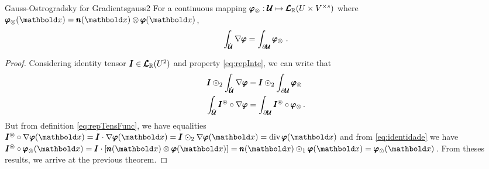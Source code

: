\begin{mcoro}{Gauss-Ostrogradsky for Gradients}{gauss2}
For a continuous mapping $\pmb{\varphi}_\otimes : \pmb{\mathcal{U}} \mapsto \pmb{\mathcal{L}}_{\mathbb{R}}(U\times V^{\times s})$ where $\fua{\vtf{\varphi}_\otimes}{\vto{x}}=\fua{\vtf{n}}{\vto{x}}\otimes\fua{\vtf{\varphi}}{\vto{x}}$,
\begin{equation*}
	\int_{\hat{\pmb{\mathcal{U}}}}\nabla{\pmb{\varphi}} = \int_{\partial{\pmb{\mathcal{U}}}}\pmb{\varphi}_\otimes\,\,.
\end{equation*}
\end{mcoro}
{\footnotesize
\begin{proof}
Considering identity tensor $\pmb{I}\in\pmb{\mathcal{L}}_{\mathbb{R}}(U^2)$ and property \eqref{eq:repInte}, we can write that
\begin{align*}
\pmb{I}\odot_2	\int_{\hat{\pmb{\mathcal{U}}}}\nabla{\pmb{\varphi}} & = \pmb{I}\odot_2 \int_{\partial{\pmb{\mathcal{U}}}}\pmb{\varphi}_\otimes\\
\int_{\hat{\pmb{\mathcal{U}}}} \pmb{{I}}^\circledast\circ\nabla{\pmb{\varphi}}& =\int_{\partial{\pmb{\mathcal{U}}}}\pmb{{I}}^\circledast\circ\pmb{\varphi}_\otimes\,.
\end{align*}
But from definition \eqref{eq:repTensFunc}, we have equalities $\fua{\frt{I}\circ\nabla{\vtf{\varphi}}}{\vto{x}}=\tnr{I}\cdot\fua{\nabla{\vtf{\varphi}}}{\vto{x}}=\tnr{I}\odot_2\fua{\nabla{\vtf{\varphi}}}{\vto{x}}=\fua{\dvt{\vtf{\varphi}}}{\vto{x}}$ and from \eqref{eq:identidade} we have $\fua{\frt{I}\circ\vtf{\varphi}_\otimes}{\vto{x}}=\tnr{I}\cdot[\fua{\vtf{n}}{\vto{x}}\otimes\fua{\vtf{\varphi}}{\vto{x}}]=\fua{\vtf{n}}{\vto{x}}\odot_1\fua{\vtf{\varphi}}{\vto{x}}=\fua{\vtf{\varphi}_\odot}{\vto{x}}$\,.	From theses results, we arrive at the previous theorem.
\end{proof}
}

